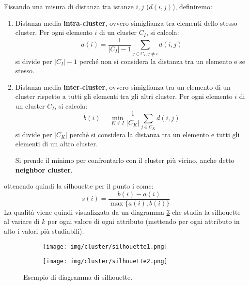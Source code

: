 Fissando una misura di distanza tra istanze $i, j$ ($d(i, j)$), definiremo:
\begin{enumerate}
      \item Distanza media \textbf{intra-cluster}, ovvero simiglianza tra
            elementi dello stesso cluster. Per ogni elemento $i$ di un cluster
            $C_I$, si calcola:
            \begin{equation}
                  a(i) = \frac{1}{|C_I| - 1} \sum_{j \in C_I, j \neq i} d(i, j)
            \end{equation}
            si divide per $|C_I| - 1 $ perché non si considera la distanza tra
            un elemento e se stesso.
      \item Distanza media \textbf{inter-cluster}, ovvero simiglianza tra un
            elemento di un cluster rispetto a tutti gli elementi tra gli altri
            cluster.  Per ogni elemento $i$ di un cluster $C_I$, si calcola:
            \begin{equation}
                  b(i) = \min_{K \neq I} \frac{1}{|C_K|} \sum_{j \in C_K} d(i, j)
            \end{equation}
            si divide per $|C_K|$ perché si considera la distanza tra un elemento
            e tutti gli elementi di un altro cluster.

            Si prende il minimo per confrontarlo con il cluster più vicino, anche
            detto \textbf{neighbor cluster}.
\end{enumerate}
ottenendo quindi la silhouette per il punto i come:
\begin{equation}
      s(i) = \frac{b(i) - a(i)}{\max\{a(i), b(i)\}}
\end{equation}
La qualità viene quindi visualizzata da un diagramma \ref{fig:silhouette} che
studia la silhouette al variare di $k$ per ogni valore di ogni attributo
(mettendo per ogni attributo in alto i valori più studiabili).
\begin{figure}
      \centering
      \begin{subfigure}[b]{0.6\textwidth}
            \centering
            \texttt{[image: img/cluster/silhouette1.png]}
            \caption{}
            \label{fig:silhouette1}
      \end{subfigure}
      \hfill
      \begin{subfigure}[b]{0.6\textwidth}
            \centering
            \texttt{[image: img/cluster/silhouette2.png]}
            \caption{}
            \label{fig:silhouette2}
      \end{subfigure}
      \caption{Esempio di diagramma di silhouette.}
      \label{fig:silhouette}
\end{figure}
